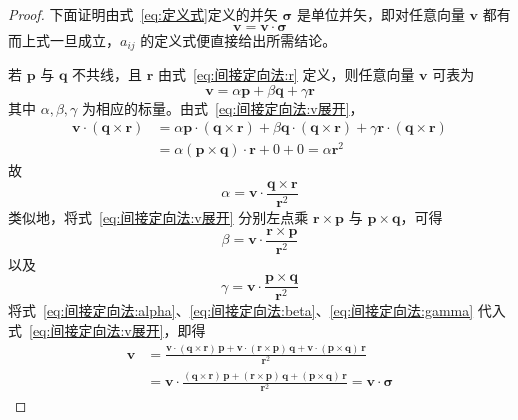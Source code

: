 \begin{proof}
    下面证明由式~\eqref{eq:定义式}定义的并矢 $\bm{\sigma}$ 是单位并矢，即对任意向量 $\mathbf{v}$ 都有
$$
\mathbf{v}=\mathbf{v}\cdot\bm{\sigma}
$$
而上式一旦成立，$a_{ij}$ 的定义式便直接给出所需结论。

若 $\mathbf{p}$ 与 $\mathbf{q}$ 不共线，且 $\mathbf{r}$ 由式~\eqref{eq:间接定向法:r} 定义，则任意向量 $\mathbf{v}$ 可表为
\begin{equation}
    \mathbf{v}=\alpha\mathbf{p}+\beta\mathbf{q}+\gamma\mathbf{r}
    \label{eq:间接定向法:v展开}
\end{equation}
其中 $\alpha,\beta,\gamma$ 为相应的标量。由式~\eqref{eq:间接定向法:v展开}，
$$
\begin{aligned}
\mathbf{v}\cdot(\mathbf{q}\times\mathbf{r})
&=\alpha\mathbf{p}\cdot(\mathbf{q}\times\mathbf{r})+\beta\mathbf{q}\cdot(\mathbf{q}\times\mathbf{r})+\gamma\mathbf{r}\cdot(\mathbf{q}\times\mathbf{r}) \\
&=\alpha(\mathbf{p}\times\mathbf{q})\cdot\mathbf{r}+0+0=\alpha\mathbf{r}^{2}
\end{aligned}
$$
故
\begin{equation}
    \alpha=\mathbf{v}\cdot\frac{\mathbf{q}\times\mathbf{r}}{\mathbf{r}^{2}}
    \label{eq:间接定向法:alpha}
\end{equation}
类似地，将式~\eqref{eq:间接定向法:v展开} 分别左点乘 $\mathbf{r}\times\mathbf{p}$ 与 $\mathbf{p}\times\mathbf{q}$，可得
\begin{equation}
    \beta=\mathbf{v}\cdot\frac{\mathbf{r}\times\mathbf{p}}{\mathbf{r}^{2}}
    \label{eq:间接定向法:beta}
\end{equation}
以及
\begin{equation}
    \gamma=\mathbf{v}\cdot\frac{\mathbf{p}\times\mathbf{q}}{\mathbf{r}^{2}}
    \label{eq:间接定向法:gamma}
\end{equation}
将式~\eqref{eq:间接定向法:alpha}、\eqref{eq:间接定向法:beta}、\eqref{eq:间接定向法:gamma} 代入式~\eqref{eq:间接定向法:v展开}，即得
$$
\begin{aligned}
\mathbf{v}
&=\frac{\mathbf{v}\cdot(\mathbf{q}\times\mathbf{r})\,\mathbf{p}+\mathbf{v}\cdot(\mathbf{r}\times\mathbf{p})\,\mathbf{q}+\mathbf{v}\cdot(\mathbf{p}\times\mathbf{q})\,\mathbf{r}}{\mathbf{r}^{2}} \\
&=\mathbf{v}\cdot\frac{(\mathbf{q}\times\mathbf{r})\,\mathbf{p}+(\mathbf{r}\times\mathbf{p})\,\mathbf{q}+(\mathbf{p}\times\mathbf{q})\,\mathbf{r}}{\mathbf{r}^{2}}=\mathbf{v}\cdot\bm{\sigma}
\end{aligned}
$$

\end{proof}

